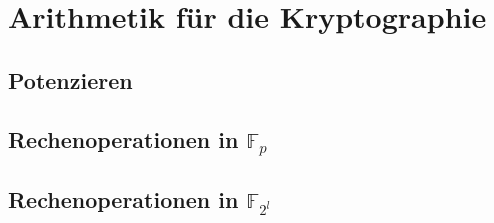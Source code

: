 %
%
%
\section{Arithmetik für die Kryptographie
\label{buch:section:arithmetik-fuer-kryptographie}}

\subsection{Potenzieren
\label{buch:subsection:potenzieren}}

\subsection{Rechenoperationen in $\mathbb{F}_p$
\label{buch:subsection:rechenoperationen-in-fp}}

\subsection{Rechenoperationen in $\mathbb{F}_{2^l}$
\label{buch:subsection:rechenoperatione-in-f2l}}

